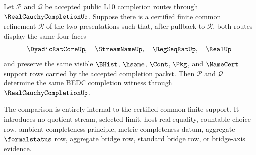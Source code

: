 \begin{theorem}
\label{thm:real-cauchy-completion-terminal-support-common-refinement-comparison}
Let $\mathcal P$ and $\mathcal Q$ be accepted public L10 completion routes through $\RealCauchyCompletionUp$. Suppose there is a certified finite common refinement $\mathcal R$ of the two presentations such that, after pullback to $\mathcal R$, both routes display the same four faces
$$
\DyadicRatCoreUp,\quad \StreamNameUp,\quad \RegSeqRatUp,\quad \RealUp
$$
and preserve the same visible $\BHist$, $\hsame$, $\Cont$, $\Pkg$, and $\NameCert$ support rows carried by the accepted completion packet. Then $\mathcal P$ and $\mathcal Q$ determine the same BEDC completion witness through $\RealCauchyCompletionUp$.

The comparison is entirely internal to the certified common finite support. It introduces no quotient stream, selected limit, host real equality, countable-choice row, ambient completeness principle, metric-completeness datum, aggregate $\formalstatus$ row, aggregate bridge row, standard bridge row, or bridge-axis evidence.
\end{theorem}
